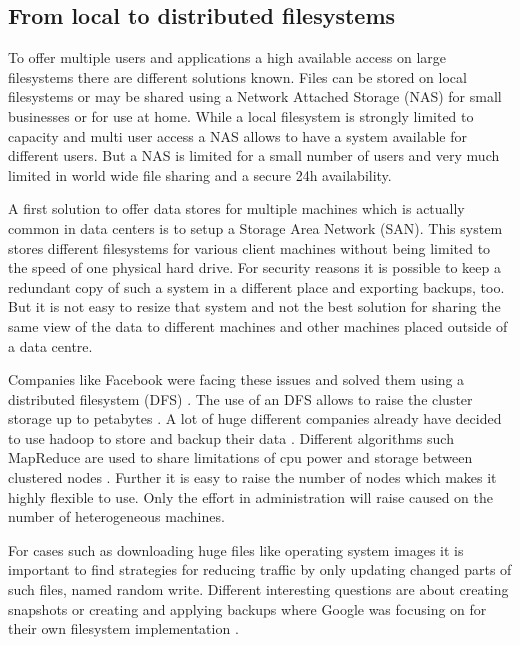 \subsection{From local to distributed filesystems}


To offer multiple users and applications a high available access on large filesystems there are different solutions known. 
Files can be stored on local filesystems or may be shared using a Network Attached Storage (NAS) for small businesses or for use at home. While a local filesystem is strongly limited to capacity and multi user access a NAS allows to have a system available for different users. But a NAS is limited for a small number of users and very much limited in world wide file sharing and a secure 24h availability.

A first solution to offer data stores for multiple machines which is actually common in data centers is to setup a Storage Area Network (SAN). This system stores different filesystems for various client machines without being limited to the speed of one physical hard drive. For security reasons it is possible to keep a redundant copy of such a system in a different place and exporting backups, too. But it is not easy to resize that system and not the best solution for sharing the same view of the data to different machines and other machines placed outside of a data centre.

Companies like Facebook were facing these issues and solved them using a distributed filesystem (DFS) \cite{fb-hadoop}. The use of an DFS allows to raise the cluster storage  up to petabytes  \cite{fb-hadoop}. A lot of huge different companies already have decided to use hadoop to store and backup their data  \cite{hadoop-poweredby}. Different algorithms such MapReduce are used to share limitations of cpu power and storage between clustered nodes \cite{dean2008mapreduce}. Further it is easy to raise the number of nodes which makes it highly flexible to use. Only the effort in administration will raise caused on the number of heterogeneous machines.

For cases such as downloading huge files like operating system images it is important to find strategies for reducing traffic by only updating changed parts of such files, named random write. Different interesting questions are about creating snapshots or creating and applying backups where Google was focusing on for their own filesystem implementation \cite{ghemawat2003google}.

